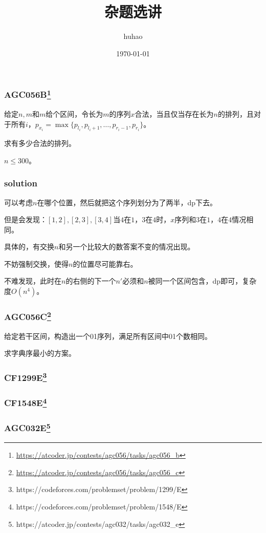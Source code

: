 \documentclass[10pt]{beamer}
\begin{document}
	\title{杂题选讲}
	\date{\today}
	\author{huhao}
	\maketitle
	\clearpage
	\begin{frame}
		\frametitle{AGC056B\footnote{\url{https://atcoder.jp/contests/agc056/tasks/agc056_b}}}
	
		给定$n,m$和$m$给个区间，令长为$m$的序列$x$合法，当且仅当存在长为$n$的排列，且对于所有$i$，$p_{x_i}=\max\{p_{l_i},p_{l_i+1},\dots,p_{r_i-1},p_{r_i}\}$。

		求有多少合法的排列。

		$n\le 300$。
	
	\end{frame}
	\clearpage
	\begin{frame}
		\frametitle{solution}
	
		可以考虑$n$在哪个位置，然后就把这个序列划分为了两半，dp下去。

		但是会发现：$[1,2],[2,3],[3,4]$当$4$在$1$，$3$在$4$时，$x$序列和$3$在$1$，$4$在$4$情况相同。

		具体的，有交换$n$和另一个比较大的数答案不变的情况出现。

		不妨强制交换，使得$n$的位置尽可能靠右。

		不难发现，此时在$n$的右侧的下一个$n'$必须和$n$被同一个区间包含，dp即可，复杂度$O(n^4)$。
	
	\end{frame}
	\clearpage
	\begin{frame}
		\frametitle{AGC056C\footnote{\url{https://atcoder.jp/contests/agc056/tasks/agc056_c}}}

		给定若干区间，构造出一个01序列，满足所有区间中01个数相同。

		求字典序最小的方案。

	\end{frame}
	\clearpage
	\begin{frame}
		\frametitle{CF1299E\footnote{https://codeforces.com/problemset/problem/1299/E}}
	
	\end{frame}
	\clearpage
	\begin{frame}
		\frametitle{CF1548E\footnote{https://codeforces.com/problemset/problem/1548/E}}
	
	\end{frame}
	\clearpage
	\begin{frame}
		\frametitle{AGC032E\footnote{https://atcoder.jp/contests/agc032/tasks/agc032\_e}}
	
	\end{frame}
\end{document}
